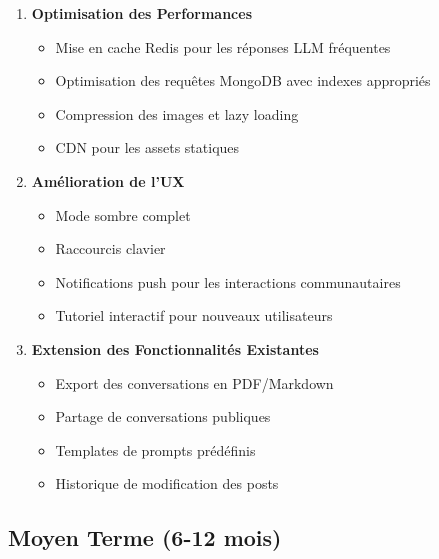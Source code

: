 \begin{enumerate}
    \item \textbf{Optimisation des Performances}
    \begin{itemize}
        \item Mise en cache Redis pour les réponses LLM fréquentes
        \item Optimisation des requêtes MongoDB avec indexes appropriés
        \item Compression des images et lazy loading
        \item CDN pour les assets statiques
    \end{itemize}
    
    \item \textbf{Amélioration de l'UX}
    \begin{itemize}
        \item Mode sombre complet
        \item Raccourcis clavier
        \item Notifications push pour les interactions communautaires
        \item Tutoriel interactif pour nouveaux utilisateurs
    \end{itemize}
    
    \item \textbf{Extension des Fonctionnalités Existantes}
    \begin{itemize}
        \item Export des conversations en PDF/Markdown
        \item Partage de conversations publiques
        \item Templates de prompts prédéfinis
        \item Historique de modification des posts
    \end{itemize}
\end{enumerate}

\subsection*{Moyen Terme (6-12 mois)}

